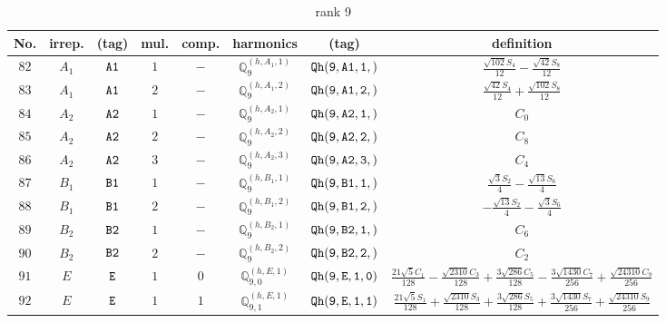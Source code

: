 \documentclass[fleqn,8pt]{jsarticle}
\begin{document}
\begin{table}[ht!]
\begin{center}
\caption{rank 9}
\renewcommand{\arraystretch}{1.3}
\begin{tabular}{cccccccc} \hline \hline
No. & irrep. & (tag) & mul. & comp. & harmonics & (tag) & definition \\ \hline
$ 82 $ & $ A_{1} $ & $ {\tt A1} $ & $ 1 $ & $ - $ & $ \mathbb{Q}_{9}^{(h,A_{1},1)} $ & $ {\tt Qh(9,A1,1,)} $ & $ \frac{\sqrt{102} S_{4}}{12} - \frac{\sqrt{42} S_{8}}{12} $ \\
$ 83 $ & $ A_{1} $ & $ {\tt A1} $ & $ 2 $ & $ - $ & $ \mathbb{Q}_{9}^{(h,A_{1},2)} $ & $ {\tt Qh(9,A1,2,)} $ & $ \frac{\sqrt{42} S_{4}}{12} + \frac{\sqrt{102} S_{8}}{12} $ \\
$ 84 $ & $ A_{2} $ & $ {\tt A2} $ & $ 1 $ & $ - $ & $ \mathbb{Q}_{9}^{(h,A_{2},1)} $ & $ {\tt Qh(9,A2,1,)} $ & $ C_{0} $ \\
$ 85 $ & $ A_{2} $ & $ {\tt A2} $ & $ 2 $ & $ - $ & $ \mathbb{Q}_{9}^{(h,A_{2},2)} $ & $ {\tt Qh(9,A2,2,)} $ & $ C_{8} $ \\
$ 86 $ & $ A_{2} $ & $ {\tt A2} $ & $ 3 $ & $ - $ & $ \mathbb{Q}_{9}^{(h,A_{2},3)} $ & $ {\tt Qh(9,A2,3,)} $ & $ C_{4} $ \\
$ 87 $ & $ B_{1} $ & $ {\tt B1} $ & $ 1 $ & $ - $ & $ \mathbb{Q}_{9}^{(h,B_{1},1)} $ & $ {\tt Qh(9,B1,1,)} $ & $ \frac{\sqrt{3} S_{2}}{4} - \frac{\sqrt{13} S_{6}}{4} $ \\
$ 88 $ & $ B_{1} $ & $ {\tt B1} $ & $ 2 $ & $ - $ & $ \mathbb{Q}_{9}^{(h,B_{1},2)} $ & $ {\tt Qh(9,B1,2,)} $ & $ - \frac{\sqrt{13} S_{2}}{4} - \frac{\sqrt{3} S_{6}}{4} $ \\
$ 89 $ & $ B_{2} $ & $ {\tt B2} $ & $ 1 $ & $ - $ & $ \mathbb{Q}_{9}^{(h,B_{2},1)} $ & $ {\tt Qh(9,B2,1,)} $ & $ C_{6} $ \\
$ 90 $ & $ B_{2} $ & $ {\tt B2} $ & $ 2 $ & $ - $ & $ \mathbb{Q}_{9}^{(h,B_{2},2)} $ & $ {\tt Qh(9,B2,2,)} $ & $ C_{2} $ \\
$ 91 $ & $ E $ & $ {\tt E} $ & $ 1 $ & $ 0 $ & $ \mathbb{Q}_{9,0}^{(h,E,1)} $ & $ {\tt Qh(9,E,1,0)} $ & $ \frac{21 \sqrt{5} C_{1}}{128} - \frac{\sqrt{2310} C_{3}}{128} + \frac{3 \sqrt{286} C_{5}}{128} - \frac{3 \sqrt{1430} C_{7}}{256} + \frac{\sqrt{24310} C_{9}}{256} $ \\
$ 92 $ & $ E $ & $ {\tt E} $ & $ 1 $ & $ 1 $ & $ \mathbb{Q}_{9,1}^{(h,E,1)} $ & $ {\tt Qh(9,E,1,1)} $ & $ \frac{21 \sqrt{5} S_{1}}{128} + \frac{\sqrt{2310} S_{3}}{128} + \frac{3 \sqrt{286} S_{5}}{128} + \frac{3 \sqrt{1430} S_{7}}{256} + \frac{\sqrt{24310} S_{9}}{256} $ \\

\end{tabular}
\end{center}
\end{table}
\end{document}
